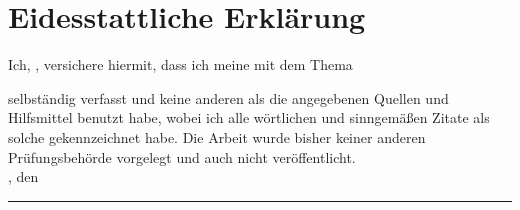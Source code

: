 \clearpage
\section*{Eidesstattliche Erklärung}


Ich, \autor, versichere hiermit, dass ich meine \textbf{\betreff} mit dem Thema
\begin{quote}
\textit{\kompletterTitel}
\end{quote}
selbständig verfasst und keine anderen als die angegebenen Quellen und Hilfsmittel benutzt habe, 
wobei ich alle wörtlichen und sinngemäßen Zitate als solche gekennzeichnet habe. Die Arbeit 
wurde bisher keiner anderen Prüfungsbehörde vorgelegt und auch nicht veröffentlicht.\\[6ex]

\noindent\ort, den \abgabetermin


\medskip
\medskip
\medskip
\noindent\rule[-0.2cm]{5.5cm}{0.5pt}

\medskip
\noindent\autor